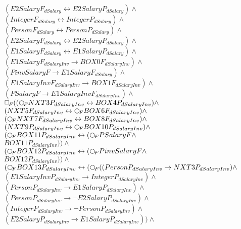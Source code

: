 \documentclass[a4paper,10pt]{article}
\begin{document}
 $ (E2SalaryF_{dSalary} \leftrightarrow E2SalaryP_{dSalary}) \land $ \\ 
 $ (IntegerF_{dSalary} \leftrightarrow IntegerP_{dSalary}) \land $ \\ 
 $ (PersonF_{dSalary} \leftrightarrow PersonP_{dSalary}) \land $ \\ 
 $ (E2SalaryF_{dSalary} \leftrightarrow E2SalaryP_{dSalary}) \land $ \\ 
 $ (E1SalaryF_{dSalary} \leftrightarrow E1SalaryP_{dSalary}) \land $ \\ 
 $ (E1SalaryF_{dSalaryInv} \rightarrow BOX0F_{dSalaryInv}) \land $ \\ 
 $ (PinvSalaryF \rightarrow E1SalaryF_{dSalary}) \land $ \\ 
 $ (E1SalaryInvF_{dSalaryInv} \rightarrow BOX1F_{dSalaryInv}) \land $ \\ 
 $ (PSalaryF \rightarrow E1SalaryInvF_{dSalaryInv}) \land $ \\ 
 $  \Rbox (( \Rnext NXT3P_{dSalaryInv} \leftrightarrow BOX4P_{dSalaryInv}) \land $ \\ 
 $ (NXT5F_{dSalaryInv} \leftrightarrow  \Rnext BOX6F_{dSalaryInv}) \land $ \\ 
 $ ( \Rnext NXT7F_{dSalaryInv} \leftrightarrow BOX8F_{dSalaryInv}) \land $ \\ 
 $ (NXT9P_{dSalaryInv} \leftrightarrow  \Rnext BOX10P_{dSalaryInv}) \land $ \\ 
 $ ( \Rnext BOX11P_{dSalaryInv} \leftrightarrow ( \Rnext PSalaryF \land $ \\ 
 $ BOX11P_{dSalaryInv})) \land $ \\ 
 $ ( \Rnext BOX12P_{dSalaryInv} \leftrightarrow ( \Rnext PinvSalaryF \land $ \\ 
 $ BOX12P_{dSalaryInv})) \land $ \\ 
 $ ( \Rnext BOX13P_{dSalaryInv} \leftrightarrow ( \Rnext ((PersonP_{dSalaryInv} \rightarrow NXT3P_{dSalaryInv}) \land $ \\ 
 $ (E1SalaryInvP_{dSalaryInv} \rightarrow IntegerP_{dSalaryInv}) \land $ \\ 
 $ (PersonP_{dSalaryInv} \rightarrow E1SalaryP_{dSalaryInv}) \land $ \\ 
 $ (PersonP_{dSalaryInv} \rightarrow  \lnot E2SalaryP_{dSalaryInv}) \land $ \\ 
 $ (IntegerP_{dSalaryInv} \rightarrow  \lnot PersonP_{dSalaryInv}) \land $ \\ 
 $ (E2SalaryP_{dSalaryInv} \rightarrow E1SalaryP_{dSalaryInv})) \land $ \\ 
\end{document}
